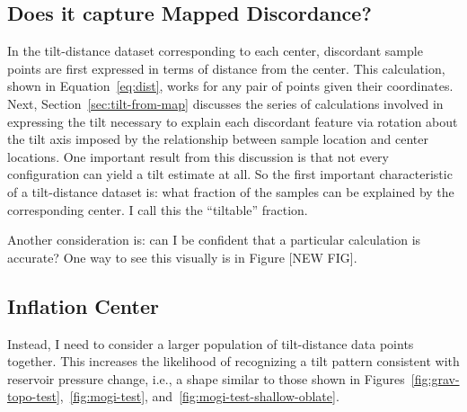 \subsection{Does it capture Mapped Discordance?}

In the tilt-distance dataset corresponding to each center, discordant sample points are first expressed in terms of distance from the center. This calculation, shown in Equation~\eqref{eq:dist}, works for any pair of points given their coordinates. Next, Section~\ref{sec:tilt-from-map} discusses the series of calculations involved in expressing the tilt necessary to explain each discordant feature via rotation about the tilt axis imposed by the relationship between sample location and center locations. One important result from this discussion is that not every configuration can yield a tilt estimate at all. So the first important characteristic of a tilt-distance dataset is: what fraction of the samples can be explained by the corresponding center. I call this the ``tiltable'' fraction.

Another consideration is: can I be confident that a particular calculation is accurate? One way to see this visually is in Figure [NEW FIG].

\subsection{Inflation Center}\label{sec:inflation-center}


Instead, I need to consider a larger population of tilt-distance data points together. This increases the likelihood of recognizing a tilt pattern consistent with reservoir pressure change, i.e., a shape similar to those shown in Figures~\ref{fig:grav-topo-test},~\ref{fig:mogi-test}, and~\ref{fig:mogi-test-shallow-oblate}. %

